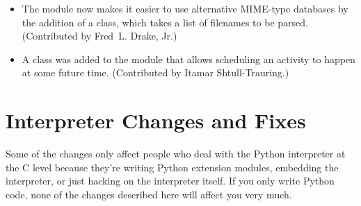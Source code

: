 \documentclass{howto}
\begin{document}
\begin{itemize}
  \item The  module now makes it easier to use
  alternative MIME-type databases by the addition of a
   class, which takes a list of filenames to be
  parsed.  (Contributed by Fred~L. Drake, Jr.)

  \item A  class was added to the 
  module that allows scheduling an activity to happen at some future
  time.  (Contributed by Itamar Shtull-Trauring.)

\end{itemize}


\section{Interpreter Changes and Fixes}

Some of the changes only affect people who deal with the Python
interpreter at the C level because they're writing Python extension modules,
embedding the interpreter, or just hacking on the interpreter itself.
If you only write Python code, none of the changes described here will
affect you very much.
\end{document}

